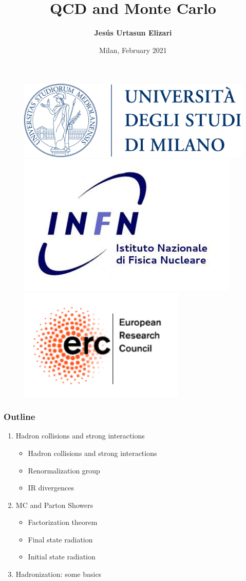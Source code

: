 \documentclass[aspectratio=43]{beamer}
\title[QCD and Monte Carlo]{QCD and Monte Carlo}
\author{\textbf {Jes\'us Urtasun Elizari}}
\date{Milan, February 2021}
\begin{document}
\begin{frame}
	
	\vspace{1.0 cm}
	
	
	\vspace{0.25 cm}

	\begin{figure}
		\includegraphics[width = 3.0 cm]{plots/logo_unimi.png}
		\hfill
		\includegraphics[width = 3.0 cm]{plots/logo_infn.png}
		\hfill
		\includegraphics[width = 3.0 cm]{plots/logo_erc.png}
		\endminipage
	\end{figure}

	\vspace{1.0 cm}

\end{frame}

\begin{frame}

	\frametitle{Outline}
	
	\begin{enumerate}
		\item {\color{blue}Hadron collisions and strong interactions}
		\begin{itemize}
			\item Hadron collisions and strong interactions
			\item Renormalization group
			\item IR divergences
		\end{itemize}
		\item {\color{blue}MC and Parton Showers}
		\begin{itemize}
			\item Factorization theorem
			\item Final state radiation
			\item Initial state radiation
		\end{itemize}
		\item {\color{blue}Hadronization: some basics}
	\end{enumerate}
	
\end{frame}
\end{document}
